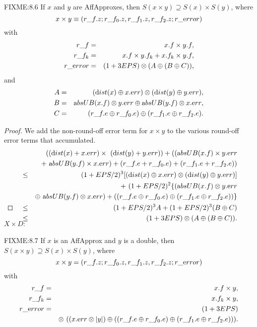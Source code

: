 \begin{proposition}{FIXME:8.6} If $x$ and $y$ are 
{\textrm AffApproxes,}
then $S(x \times y) \supseteq S(x) \times S(y)${\textrm ,} where
$$x \times y \equiv (r\_f.z; r\_f_0.z, r\_f_1.z, r\_f_2.z; r\_{\textrm error})$$
with
\begin{eqnarray*}
r\_f &=& x.f \times y.f,\\
r\_f_k &=& x.f \times y.f_k + x.f_k \times y.f,\\
r\_{\textrm error} &=& 
(1 + 3EPS) \otimes (A \oplus (B \oplus C)),\end{eqnarray*}
and
\begin{eqnarray*}
A &=& ({\textrm dist}(x) \oplus x.{\textrm err})\otimes ({\textrm dist}(y) \oplus y.{\textrm err}),
\\
B& =& {\textrm absUB}(x.f) \otimes
y.{\textrm err} \oplus {\textrm absUB}(y.f) \otimes x.{\textrm err},\\
C& =& (r\_f.e \oplus r\_f_0.e) \oplus (r\_f_1.e \oplus
r\_f_2.e).\end{eqnarray*}
\end{proposition}

\begin{proof}{}
We add the non-round-off error term for $x \times y$ to the various round-off error terms that accumulated.
\begin{eqnarray*}
&&\hskip-48pt (({\textrm dist}(x) + x.{\textrm err}) \times\ ({\textrm dist}(y) + y.{\textrm err})) +
 (({\textrm absUB}(x.f) \times y.{\textrm err} 
\\
&& +\ 
{\textrm absUB}(y.f) \times x.{\textrm err}) +
 (r\_f.e + r\_f_0.e) + (r\_f_1.e + r\_f_2.e))
\\
&\le& 
(1+EPS/2)^3[({\textrm dist}(x) \oplus x.{\textrm err})\otimes ({\textrm dist}(y) \oplus y.{\textrm err})]\\
&& +\
 (1+EPS/2)^2\{({\textrm absUB}(x.f) \otimes y.{\textrm err} 
\\
& &\oplus\ 
{\textrm absUB}(y.f) \otimes x.{\textrm err}) +
((r\_f.e \oplus r\_f_0.e) \oplus (r\_f_1.e \oplus r\_f_2.e))\}
\\
&\le& (1+EPS/2)^3 A + (1+EPS/2)^3 (B \oplus C) \\
&\le& (1+3EPS) \otimes (A \oplus (B \oplus C) ). \\
\noalign{\vskip-36pt}
\end{eqnarray*}
\end{proof}

$X \times D$: 

\begin{proposition}{FIXME:8.7} \hskip-8pt If $x$ is an 
AffApprox  and $y$ is a double{\textrm ,} 
then $S(x \times y) \supseteq S(x) \times S(y)${\textrm ,} where
$$x \times y = (r\_f.z; r\_f_0.z, r\_f_1.z, r\_f_2.z; r\_{\textrm error})$$
with
\begin{eqnarray*}
r\_f& =& x.f \times y,\\
r\_f_k &=& x.f_k \times y,\\
r\_{\textrm error} &=& (1+3EPS)\\
&& \otimes\ ( (x.{\textrm err} \otimes |y|) \oplus
( (r\_f.e \oplus r\_f_0.e) \oplus (r\_f_1.e \oplus r\_f_2.e)) ).
\end{eqnarray*}
\end{proposition}

